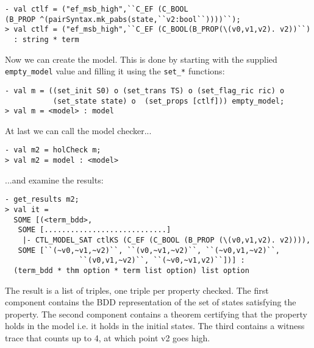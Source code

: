\begin{session}\begin{verbatim}
- val ctlf = ("ef_msb_high",``C_EF (C_BOOL
(B_PROP ^(pairSyntax.mk_pabs(state,``v2:bool``))))``);
> val ctlf = ("ef_msb_high",``C_EF (C_BOOL(B_PROP(\(v0,v1,v2). v2))``)
  : string * term
\end{verbatim}\end{session}
Now we can create the model. This is done by starting with the supplied \texttt{empty\_model} value and filling it using the \texttt{set\_*} functions:
\begin{session}\begin{verbatim}
- val m = ((set_init S0) o (set_trans TS) o (set_flag_ric ric) o
           (set_state state) o  (set_props [ctlf])) empty_model;
> val m = <model> : model
\end{verbatim}\end{session}
At last we can call the model checker...
\begin{session}\begin{verbatim}
- val m2 = holCheck m;
> val m2 = model : <model>
\end{verbatim}\end{session}
...and examine the results:
\begin{session}\begin{verbatim}
- get_results m2;
> val it =
  SOME [(<term_bdd>,
   SOME [............................]
    |- CTL_MODEL_SAT ctlKS (C_EF (C_BOOL (B_PROP (\(v0,v1,v2). v2)))),
   SOME [``(~v0,~v1,~v2)``, ``(v0,~v1,~v2)``, ``(~v0,v1,~v2)``,
                 ``(v0,v1,~v2)``, ``(~v0,~v1,v2)``])] :
  (term_bdd * thm option * term list option) list option
\end{verbatim}\end{session}
The result is a list of triples, one triple per property checked. The first component contains the BDD representation of the set of states satisfying the property. The second component contains a theorem certifying that the property holds in the model i.e. it holds in the initial states. The third contains a witness trace that counts up to 4, at which point v2 goes high.

